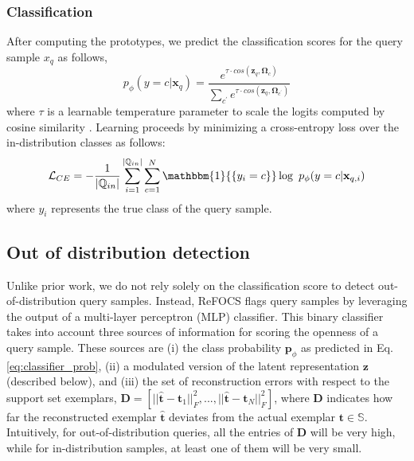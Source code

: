\subsubsection*{Classification} After computing the prototypes, we predict the classification scores for the query sample $x_q$ as follows,
\begin{equation}
    p_{\phi}(y=c|\mathbf{x}_q) = \frac{e^{\tau \cdot cos(\mathbf{z}_q,\mathbf{\Omega}_c)}}{\sum\limits_{c^{'}}e^{\tau \cdot
    cos(\mathbf{z}_q,\mathbf{\Omega}_{c^{'}})}}
    \label{eq:classifier_prob}
\end{equation}
where $\tau$ is a learnable temperature parameter to scale the logits computed by cosine similarity  \cite{chen2020new,gidaris2018dynamic}. Learning proceeds by minimizing a cross-entropy loss over the in-distribution classes as follows:
\vspace{1pt}
\begin{equation}
    \mathcal{L}_{CE} =-\frac{1}{|\mathbb{Q}_{in}|}\sum_{i=1}^{|\mathbb{Q}_{in}|} \sum_{c=1}^{N} \mathbbm{1}{\{y_i=c\}}\log \ p_{\phi}(y=c|\mathbf{x}_{q,i})
    \label{eq:ce}
\end{equation}
where $y_i$ represents the true class of the query sample.

\subsection{Out of distribution detection}
Unlike prior work, we do not rely solely on the classification score to detect out-of-distribution query samples. Instead, ReFOCS flags query samples by leveraging the output of a multi-layer perceptron (MLP) classifier. This binary classifier takes into account three sources of information for scoring the openness of a query sample. These sources are (i) the class probability $\mathbf{p}_{\phi}$ as predicted in Eq. \ref{eq:classifier_prob}, (ii) a modulated version of the latent representation $\mathbf{z}$ (described below), and (iii) the set of reconstruction errors with respect to the support set exemplars, $\mathbf{D} =\left[||\hat{\mathbf{t}} -  \mathbf{t}_1||_F^2,...,||\hat{\mathbf{t}} -  \mathbf{t}_N||_F^2\right]$, where $\mathbf{D}$ indicates how far the reconstructed exemplar $\hat{\mathbf{t}}$ deviates from the actual exemplar $\mathbf{t} \in \mathbb{S}$. Intuitively, for out-of-distribution queries, all the entries of $\mathbf{D}$ will be very high, while for in-distribution samples, at least one of them will be very small. 

